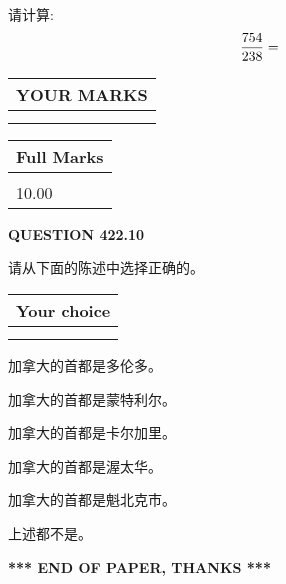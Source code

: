 \documentclass{ctexart}
\begin{document}
  
 
请计算:
\begin{equation}
\frac { %
754 }  {  %
238} = \nonumber
\end{equation}
 

 

 
  
\vspace{0.2in}
  
\noindent\begin{tabular}{|l|}
\hline
 YOUR MARKS  \\
\hline
 \\ 
 \\ 
\hline
\end{tabular}
\hspace{0.05in} \begin{tabular}{|l|}
\hline
 Full Marks  \\
\hline
 \\ 
10.00 \\
\hline
\end{tabular}
{\textbf{\Large{QUESTION
422.10 
}}}
  
  
请从下面的陈述中选择正确的。
  
  
\noindent\hspace{3.0in} \begin{tabular}{|l|}
\hline
Your choice \\
\hline
 \\ 
 \\ 
\hline
\end{tabular}
  
  
 
 
加拿大的首都是多伦多。
 
 
加拿大的首都是蒙特利尔。
 
 
加拿大的首都是卡尔加里。
 
 
加拿大的首都是渥太华。
 
 
加拿大的首都是魁北克市。
 
 
 上述都不是。
 
 
   
   
 \vspace{0.2in}
 
   
   
   
   
\vspace{1.0in} 
{\textbf{\large{ *** END OF PAPER, THANKS *** }}} 
   
\end{document}
